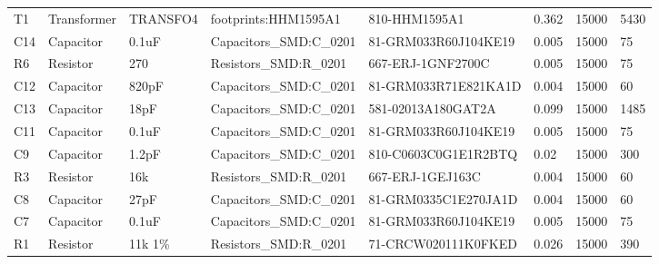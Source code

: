 \begin{landscape}
\begin{table}[]
\begin{tabular}{llllllll}
T1             & Transformer   & TRANSFO4                   & footprints:HHM1595A1            & 810-HHM1595A1                        & 0.362                & 15000           & 5430                 \\
C14            & Capacitor     & 0.1uF                      & Capacitors\_SMD:C\_0201         & 81-GRM033R60J104KE19                 & 0.005                & 15000           & 75                   \\
R6             & Resistor      & 270                        & Resistors\_SMD:R\_0201          & 667-ERJ-1GNF2700C                    & 0.005                & 15000           & 75                   \\
C12            & Capacitor     & 820pF                      & Capacitors\_SMD:C\_0201         & 81-GRM033R71E821KA1D                 & 0.004                & 15000           & 60                   \\
C13            & Capacitor     & 18pF                       & Capacitors\_SMD:C\_0201         & 581-02013A180GAT2A                   & 0.099                & 15000           & 1485                 \\
C11            & Capacitor     & 0.1uF                      & Capacitors\_SMD:C\_0201         & 81-GRM033R60J104KE19                 & 0.005                & 15000           & 75                   \\
C9             & Capacitor     & 1.2pF                      & Capacitors\_SMD:C\_0201         & 810-C0603C0G1E1R2BTQ                 & 0.02                 & 15000           & 300                  \\
R3             & Resistor      & 16k                        & Resistors\_SMD:R\_0201          & 667-ERJ-1GEJ163C                     & 0.004                & 15000           & 60                   \\
C8             & Capacitor     & 27pF                       & Capacitors\_SMD:C\_0201         & 81-GRM0335C1E270JA1D                 & 0.004                & 15000           & 60                   \\
C7             & Capacitor     & 0.1uF                      & Capacitors\_SMD:C\_0201         & 81-GRM033R60J104KE19                 & 0.005                & 15000           & 75                   \\
R1             & Resistor      & 11k 1\%                    & Resistors\_SMD:R\_0201          & 71-CRCW020111K0FKED                  & 0.026                & 15000           & 390                  \\

\end{tabular}
\end{table}
\end{landscape}
